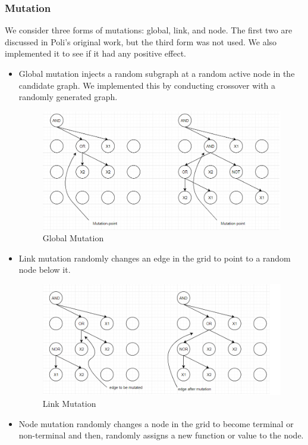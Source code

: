 \documentclass{article}
\begin{document}
	
	\subsubsection{Mutation}
	We consider three forms of mutations: global, link, and node. The first two are discussed in Poli’s original work, but the third form was not used. We also implemented it to see if it had any positive effect.
	\begin{itemize}
		\item Global mutation injects a random subgraph at a random active node in the candidate graph. We implemented this by conducting crossover with a randomly generated graph.
		\begin{figure}
			\centering
			\includegraphics[width=\textwidth]{sample4.png}
			\caption{Global Mutation}
			\label{sample4}
		\end{figure}
		
		\item Link mutation randomly changes an edge in the grid to point to a random node below it.
		\begin{figure}
			\centering
			\includegraphics[width=\textwidth]{sample5.png}
			\caption{Link Mutation}
			\label{sample5}
		\end{figure}	
	
		\item Node mutation randomly changes a node in the grid to become terminal or non-terminal and then, randomly assigns a new function or value to the node.
		

\end{itemize}
\end{document}
